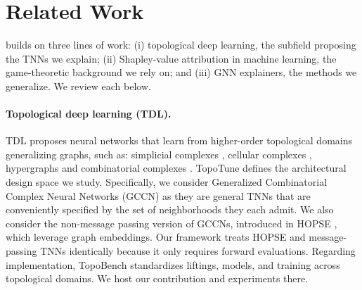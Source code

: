 \section{Related Work}
\label{sec:related}

\method builds on three lines of work: (i) topological deep learning, the
subfield proposing the TNNs we explain; (ii) Shapley-value attribution in
machine learning, the game-theoretic background we rely on; and (iii) GNN
explainers, the methods we generalize. We review each below.

\paragraph{Topological deep learning (TDL).}
TDL proposes neural networks that learn from higher-order topological domains generalizing graphs, such as: simplicial complexes \citep{ebli2020simplicial}, cellular complexes \citep{bodnar2021cwn}, hypergraphs \citep{feng2019Hypergraph} and combinatorial complexes
\citep{hajij2023tdl}.
TopoTune \citep{papillon2025topotune} defines the architectural design space we study. Specifically, we consider Generalized Combinatorial Complex Neural Networks (GCCN) as they are general TNNs that are conveniently specified by the set of neighborhoods they each admit. We also consider the non-message passing version of GCCNs, introduced in HOPSE \citep{hopse2025}, which leverage graph embeddings. Our framework treats HOPSE and message-passing TNNs identically because it only requires forward evaluations. Regarding implementation, TopoBench \citep{telyatnikov2024topobench} standardizes liftings, models, and training across topological domains. We host our contribution and experiments there. 

